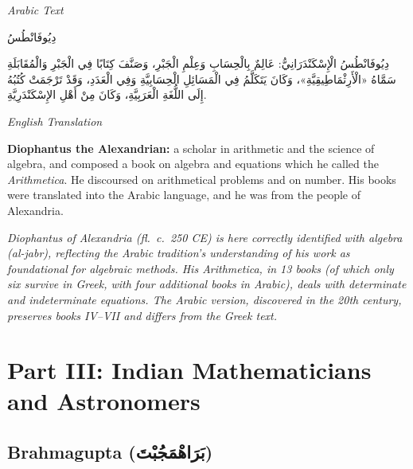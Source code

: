 \documentclass[11pt,a4paper]{article}
\def\RL#1{\beginR#1\endR}
\newcommand{\cnote}[1]{\textcolor{notecolor}{\textit{#1}}}
\newcommand{\textarabic}[1]{{\arabicfont\RL{#1}}}
\newenvironment{arabiccol}{%
  \begin{minipage}[t]{0.48\textwidth}%
  \begin{tcolorbox}[colback=leftbg,colframe=rulecolor,boxrule=0.4pt,arc=2pt,left=5pt,right=5pt,top=5pt,bottom=5pt]%
  \centering\textit{\footnotesize Arabic Text}\\[0.4em]%
  \raggedright\arabicfont\small%
}{%
  \end{tcolorbox}%
  \end{minipage}%
}
\newenvironment{englishcol}{%
  \begin{minipage}[t]{0.48\textwidth}%
  \begin{tcolorbox}[colback=rightbg,colframe=rulecolor,boxrule=0.4pt,arc=2pt,left=5pt,right=5pt,top=5pt,bottom=5pt]%
  \centering\textit{\footnotesize English Translation}\\[0.4em]%
  \raggedright\small%
}{%
  \end{tcolorbox}%
  \end{minipage}%
}
\begin{document}
\noindent
\begin{arabiccol}
\beginR
دِيُوفَانْطُسُ

دِيُوفَانْطُسُ الْإِسْكَنْدَرَانِيُّ: عَالِمٌ بِالْحِسَابِ وَعِلْمِ الْجَبْرِ، وَصَنَّفَ كِتَابًا فِي الْجَبْرِ وَالْمُقَابَلَةِ سَمَّاهُ «الْأَرِثْمَاطِيقِيَّةِ»، وَكَانَ يَتَكَلَّمُ فِي الْمَسَائِلِ الْحِسَابِيَّةِ وَفِي الْعَدَدِ، وَقَدْ تَرْجَمَتْ كُتُبُهُ إِلَى اللُّغَةِ الْعَرَبِيَّةِ، وَكَانَ مِنْ أَهْلِ الإِسْكَنْدَرِيَّةِ.
\endR
\end{arabiccol}
\hfill
\begin{englishcol}
\textbf{Diophantus the Alexandrian:} a scholar in arithmetic and the science of algebra, and composed a book on algebra and equations which he called the \textit{Arithmetica}. He discoursed on arithmetical problems and on number. His books were translated into the Arabic language, and he was from the people of Alexandria.

\cnote{Diophantus of Alexandria (fl.~c.~250 CE) is here correctly identified with algebra (\textit{al-jabr}), reflecting the Arabic tradition's understanding of his work as foundational for algebraic methods. His \textit{Arithmetica}, in 13 books (of which only six survive in Greek, with four additional books in Arabic), deals with determinate and indeterminate equations. The Arabic version, discovered in the 20th century, preserves books IV--VII and differs from the Greek text.}
\end{englishcol}

\par\vspace{0.5em}

\newpage

\section{Part III: Indian Mathematicians and Astronomers}
\label{sec:indian}

\subsection{Brahmagupta (\textarabic{بَرَاهْمَجُبْتَ})}
\end{document}
